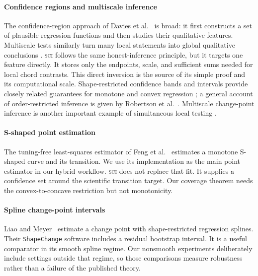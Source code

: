 \documentclass{interact}
\theoremstyle{definition}
\theoremstyle{remark}
\newcommand{\SCI}{\textnormal{\textsc{sci}}\xspace}
\begin{document}
\paragraph{Confidence regions and multiscale inference}
The confidence-region approach of Davies et al.~\citep{davies2009nonparametric} is broad: it
first constructs a set of plausible regression functions and then studies
their qualitative features.  Multiscale tests similarly turn many local
statements into global qualitative conclusions
\citep{dumbgen2001multiscale,schmidthieber2013multiscale}.  \SCI follows the
same honest-inference principle, but it targets one feature directly.  It
stores only the endpoints, scale, and sufficient sums needed for local chord
contrasts.  This direct inversion is the source of its simple proof and its
computational scale.  Shape-restricted confidence bands and intervals provide
closely related guarantees for monotone and convex regression
\citep{dumbgen2003optimal,cai2013adaptive}; a general account of order-restricted
inference is given by Robertson et al.~\citep{robertson1988order}.
Multiscale change-point inference
is another important example of simultaneous local testing
\citep{frick2014multiscale}.

\paragraph{S-shaped point estimation}
The tuning-free least-squares estimator of Feng et al.~\citep{feng2022sshaped} estimates a
monotone S-shaped curve and its transition.  We use its implementation as the
main point estimator in our hybrid workflow.  \SCI does not replace that fit.
It supplies a confidence set around the scientific transition target.  Our
coverage theorem needs the convex-to-concave restriction but not monotonicity.

\paragraph{Spline change-point intervals}
Liao and Meyer~\citep{liao2017changepoint} estimate a change point with shape-restricted
regression splines.  Their \texttt{ShapeChange} software includes a residual
bootstrap interval.  It is a useful comparator in its smooth spline regime.
Our nonsmooth experiments deliberately include settings outside that regime,
so those comparisons measure robustness rather than a failure of the published
theory.
\end{document}
